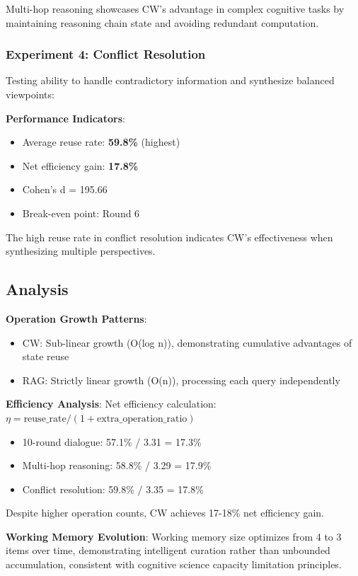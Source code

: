 \documentclass[10pt,twocolumn]{article}
\begin{document}
Multi-hop reasoning showcases CW's advantage in complex cognitive tasks by maintaining reasoning chain state and avoiding redundant computation.

\subsubsection{Experiment 4: Conflict Resolution}

Testing ability to handle contradictory information and synthesize balanced viewpoints:

\textbf{Performance Indicators}:
\begin{itemize}
\item Average reuse rate: \textbf{59.8\%} (highest)
\item Net efficiency gain: \textbf{17.8\%}
\item Cohen's d = 195.66
\item Break-even point: Round 6
\end{itemize}

The high reuse rate in conflict resolution indicates CW's effectiveness when synthesizing multiple perspectives.

\subsection{Analysis}

\textbf{Operation Growth Patterns}:
\begin{itemize}
\item CW: Sub-linear growth (O(log n)), demonstrating cumulative advantages of state reuse
\item RAG: Strictly linear growth (O(n)), processing each query independently
\end{itemize}

\textbf{Efficiency Analysis}:
Net efficiency calculation: $\eta = \text{reuse\_rate} / (1 + \text{extra\_operation\_ratio})$
\begin{itemize}
\item 10-round dialogue: 57.1\% / 3.31 = 17.3\%
\item Multi-hop reasoning: 58.8\% / 3.29 = 17.9\%
\item Conflict resolution: 59.8\% / 3.35 = 17.8\%
\end{itemize}

Despite higher operation counts, CW achieves 17-18\% net efficiency gain.

\textbf{Working Memory Evolution}:
Working memory size optimizes from 4 to 3 items over time, demonstrating intelligent curation rather than unbounded accumulation, consistent with cognitive science capacity limitation principles.
\end{document}
